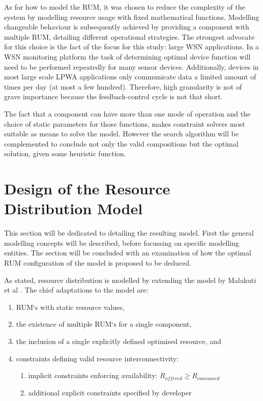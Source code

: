 As for how to model the RUM, it was chosen to reduce the complexity of the system by modelling resource usage with fixed mathematical functions. Modelling changeable behaviour is subsequently achieved by providing a component with multiple RUM, detailing different operational strategies. The strongest advocate for this choice is the fact of the focus for this study: large WSN applications. In a WSN monitoring platform the task of determining optimal device function will need to be performed repeatedly for many sensor devices. Additionally, devices in most large scale LPWA applications only communicate data a limited amount of times per day (at most a few hundred)\cite{nbiot_battery_not_suitable, lora_vs_sigfox_boek}. Therefore, high granularity is not of grave importance because the feedback-control cycle is not that short. 

The fact that a component can have more than one mode of operation and the choice of static parameters for those functions, makes constraint solvers most suitable as means to solve the model. However the search algorithm will be complemented to conclude not only the valid compositions but the optimal solution, given some heuristic function.

\section{Design of the Resource Distribution Model}
This section will be dedicated to detailing the resulting model. First the general modelling concepts will be described, before focussing on specific modelling entities. The section will be concluded with an examination of how the optimal RUM configuration of the model is proposed to be deduced.

As stated, resource distribution is modelled by extending the model by Malakuti et al \cite{steven_te_brinke}. The chief adaptations to the model are:
\begin{enumerate}
\nospace
\item RUM`s with static resource values,
\item the existence of multiple RUM`s for a single component,
\item the inclusion of a single explicitly defined optimised resource, and
\item constraints defining valid resource interconnectivity:
\begin{enumerate}
\nospace
\item implicit constraints enforcing availability: $R_{offered} \geq R_{consumed}$
\item additional explicit constraints specified by developer
\end{enumerate}
\end{enumerate}

